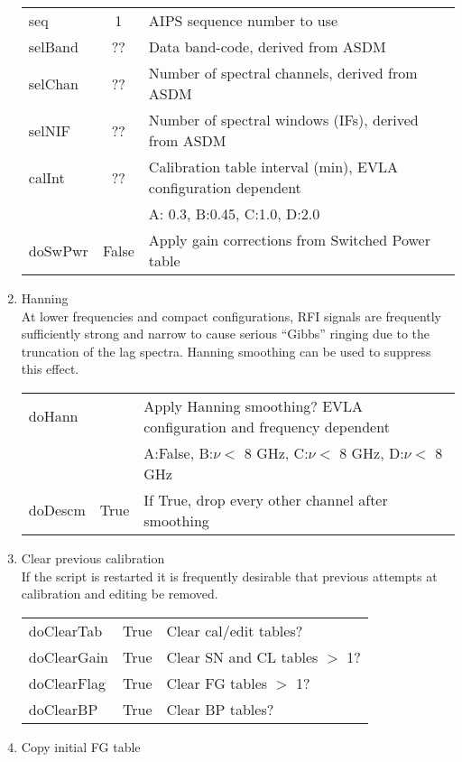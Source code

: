 \documentclass[11pt]{article}
\begin{document}
\begin{enumerate}
\begin{center}
\begin{tabular}{|l|c|l|}
seq     & 1 &  AIPS sequence number to use \\
selBand & ??  &  Data band-code, derived from ASDM\\
selChan & ??  &  Number of spectral channels, derived from ASDM\\
selNIF  & ??  &  Number of spectral windows (IFs), derived from ASDM\\
calInt  & ??  &  Calibration table interval (min), EVLA configuration
dependent\\
  &  & A: 0.3, B:0.45, C:1.0, D:2.0\\
doSwPwr & False  &  Apply gain corrections from Switched Power table\\
\hline
\end{tabular}
\end{center}
%
\item Hanning \\
At lower frequencies and compact configurations, RFI signals are
frequently sufficiently strong and narrow to cause serious ``Gibbs''
ringing due to the truncation of the lag spectra.
Hanning smoothing can be used to suppress this effect.
\begin{center}
\begin{tabular}{|l|c|l|}
\hline
doHann  &  &  Apply Hanning smoothing? EVLA configuration
 and frequency dependent\\
  &  & A:False, B:$\nu<$ 8 GHz, C:$\nu<$ 8 GHz, D:$\nu<$ 8 GHz\\
doDescm  & True  & If True, drop every other channel after smoothing  \\
\hline
\end{tabular}
\end{center}
%
\item Clear previous calibration\\
If the script is restarted it is frequently desirable that previous
attempts at calibration and editing be removed.
\begin{center}
\begin{tabular}{|l|c|l|}
\hline
doClearTab   & True & Clear cal/edit tables? \\
doClearGain  & True & Clear SN and CL tables $>$ 1? \\
doClearFlag  & True & Clear FG tables $>$ 1? \\
doClearBP    & True & Clear BP tables? \\
\hline
\end{tabular}
\end{center}
%
\item Copy initial FG table \\

\end{enumerate}
\end{document}
